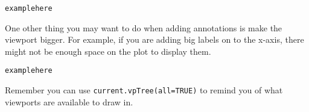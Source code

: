 \begin{alltt}
example here
\end{alltt}

One other thing you may want to do when adding annotations is make the viewport bigger.  For example, if you are adding big labels on to the x-axis, there might not be enough space on the plot to display them.  

\begin{alltt}
example here
\end{alltt}

Remember you can use {\tt current.vpTree(all=TRUE)} to remind you of what viewports are available to draw in.



